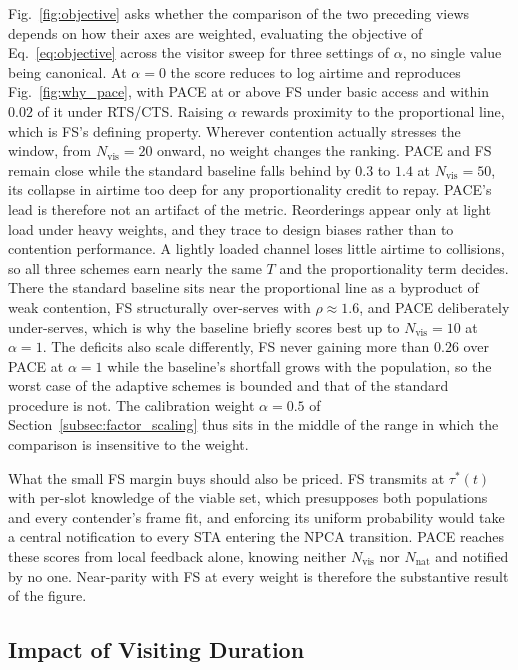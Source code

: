 \documentclass[journal,10pt]{IEEEtran}
\newcommand{\Nvis}{N_\mathrm{vis}}
\newcommand{\Nnat}{N_\mathrm{nat}}
\begin{document}
Fig.~\ref{fig:objective} asks whether the comparison of the two
preceding views depends on how their axes are weighted, evaluating the
objective of Eq.~\eqref{eq:objective} across the visitor sweep for
three settings of $\alpha$, no single value being canonical. At
$\alpha=0$ the score reduces to log airtime and reproduces
Fig.~\ref{fig:why_pace}, with PACE at or above FS under basic access
and within $0.02$ of it under RTS/CTS. Raising $\alpha$ rewards
proximity to the proportional line, which is FS's defining property.
Wherever contention actually stresses the window, from $\Nvis=20$
onward, no weight changes the ranking. PACE and FS remain close while
the standard baseline falls behind by $0.3$ to $1.4$ at $\Nvis=50$,
its collapse in airtime too deep for any proportionality credit to
repay. PACE's lead is therefore not an artifact of the metric.
Reorderings appear only at light load under heavy weights, and they
trace to design biases rather than to contention performance. A
lightly loaded channel loses little airtime to collisions, so all
three schemes earn nearly the same $T$ and the proportionality term
decides. There the standard baseline sits near the proportional line
as a byproduct of weak contention, FS structurally over-serves with
$\rho\approx1.6$, and PACE deliberately under-serves, which is why the
baseline briefly scores best up to $\Nvis=10$ at $\alpha=1$. The
deficits also scale differently, FS never gaining more than $0.26$
over PACE at $\alpha=1$ while the baseline's shortfall grows with the
population, so the worst case of the adaptive schemes is bounded and
that of the standard procedure is not. The
calibration weight $\alpha=0.5$ of
Section~\ref{subsec:factor_scaling} thus sits in the middle of the
range in which the comparison is insensitive to the weight.

What the small FS margin buys should also be priced. FS transmits at
$\tau^*(t)$ with per-slot knowledge of the viable set, which
presupposes both populations and every contender's frame fit, and
enforcing its uniform probability would take a central notification to
every STA entering the NPCA transition. PACE reaches these scores from
local feedback alone, knowing neither $\Nvis$ nor $\Nnat$ and notified
by no one. Near-parity with FS at every weight is therefore the
substantive result of the figure.

\subsection{Impact of Visiting Duration}
\label{subsec:eval_duration}
\end{document}
